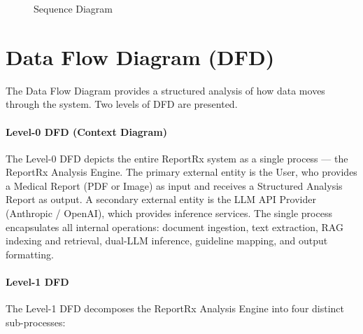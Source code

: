 \begin{figure}[h]
    \centering
    \caption{Sequence Diagram}
\end{figure}

\section{Data Flow Diagram (DFD)}
The Data Flow Diagram provides a structured analysis of how data moves through the system. Two levels of DFD are presented.

\paragraph{Level-0 DFD (Context Diagram)}
The Level-0 DFD depicts the entire ReportRx system as a single process --- the ReportRx Analysis Engine. The primary external entity is the User, who provides a Medical Report (PDF or Image) as input and receives a Structured Analysis Report as output. A secondary external entity is the LLM API Provider (Anthropic / OpenAI), which provides inference services. The single process encapsulates all internal operations: document ingestion, text extraction, RAG indexing and retrieval, dual-LLM inference, guideline mapping, and output formatting.

\paragraph{Level-1 DFD}
The Level-1 DFD decomposes the ReportRx Analysis Engine into four distinct sub-processes:

